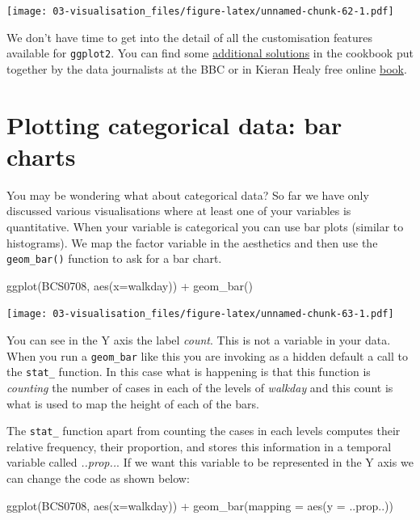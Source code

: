 \documentclass[
]{book}
\newenvironment{Shaded}{\begin{snugshade}}{\end{snugshade}}
\newcommand{\AttributeTok}[1]{\textcolor[rgb]{0.77,0.63,0.00}{#1}}
\newcommand{\FunctionTok}[1]{\textcolor[rgb]{0.00,0.00,0.00}{#1}}
\newcommand{\NormalTok}[1]{#1}
\newcommand{\SpecialCharTok}[1]{\textcolor[rgb]{0.00,0.00,0.00}{#1}}
\begin{document}
\texttt{[image: 03-visualisation\_files/figure-latex/unnamed-chunk-62-1.pdf]}

We don't have time to get into the detail of all the customisation features available for \texttt{ggplot2}. You can find some \href{https://bbc.github.io/rcookbook/}{additional solutions} in the cookbook put together by the data journalists at the BBC or in Kieran Healy free online \href{https://socviz.co/}{book}.

\hypertarget{plotting-categorical-data-bar-charts}{%
\section{Plotting categorical data: bar charts}\label{plotting-categorical-data-bar-charts}}

You may be wondering what about categorical data? So far we have only discussed various visualisations where at least one of your variables is quantitative. When your variable is categorical you can use bar plots (similar to histograms). We map the factor variable in the aesthetics and then use the \texttt{geom\_bar()} function to ask for a bar chart.

\begin{Shaded}
\begin{Highlighting}[]
\FunctionTok{ggplot}\NormalTok{(BCS0708, }\FunctionTok{aes}\NormalTok{(}\AttributeTok{x=}\NormalTok{walkday)) }\SpecialCharTok{+}
  \FunctionTok{geom\_bar}\NormalTok{()}
\end{Highlighting}
\end{Shaded}

\texttt{[image: 03-visualisation\_files/figure-latex/unnamed-chunk-63-1.pdf]}

You can see in the Y axis the label \emph{count}. This is not a variable in your data. When you run a \texttt{geom\_bar} like this you are invoking as a hidden default a call to the \texttt{stat\_} function. In this case what is happening is that this function is \emph{counting} the number of cases in each of the levels of \emph{walkday} and this count is what is used to map the height of each of the bars.

The \texttt{stat\_} function apart from counting the cases in each levels computes their relative frequency, their proportion, and stores this information in a temporal variable called \emph{..prop..}. If we want this variable to be represented in the Y axis we can change the code as shown below:

\begin{Shaded}
\begin{Highlighting}[]
\FunctionTok{ggplot}\NormalTok{(BCS0708, }\FunctionTok{aes}\NormalTok{(}\AttributeTok{x=}\NormalTok{walkday)) }\SpecialCharTok{+}
  \FunctionTok{geom\_bar}\NormalTok{(}\AttributeTok{mapping =} \FunctionTok{aes}\NormalTok{(}\AttributeTok{y =}\NormalTok{ ..prop..))}
\end{Highlighting}
\end{Shaded}
\end{document}
